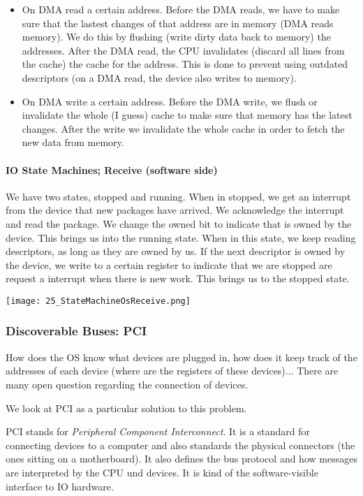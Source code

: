 \begin{itemize}
    \item On DMA read a certain address. Before the DMA reads, we have to make sure that the lastest changes of that address are in memory (DMA reads memory). We do this by flushing (write dirty data back to memory) the addresses. After the DMA read, the CPU invalidates (discard all lines from the cache) the cache for the address. This is done to prevent using outdated descriptors (on a DMA read, the device also writes to memory).
    \item On DMA write a certain address. Before the DMA write, we flush or invalidate the whole (I guess) cache to make sure that memory has the latest changes. After the write we invalidate the whole cache in order to fetch the new data from memory.
\end{itemize}

\paragraph{IO State Machines; Receive (software side)}
We have two states, stopped and running. When in stopped, we get an interrupt from the device that new packages have arrived. We acknowledge the interrupt and read the package. We change the owned bit to indicate that is owned by the device. This brings us into the running state. When in this state, we keep reading descriptors, as long as they are owned by us. If the next descriptor is owned by the device, we write to a certain register to indicate that we are stopped are request a interrupt when there is new work. This brings us to the stopped state.

\texttt{[image: 25\_StateMachineOsReceive.png]}

\subsubsection{Discoverable Buses: PCI}
How does the OS know what devices are plugged in, how does it keep track of the addresses of each device (where are the registers of these devices)... There are many open question regarding the connection of devices.

We look at PCI as a particular solution to this problem.

PCI stands for \textit{Peripheral Component Interconnect}. It is a standard for connecting devices to a computer and also standards the physical connectors (the ones sitting on a motherboard). It also defines the bus protocol and how messages are interpreted by the CPU und devices. It is kind of the software-visible interface to IO hardware.

